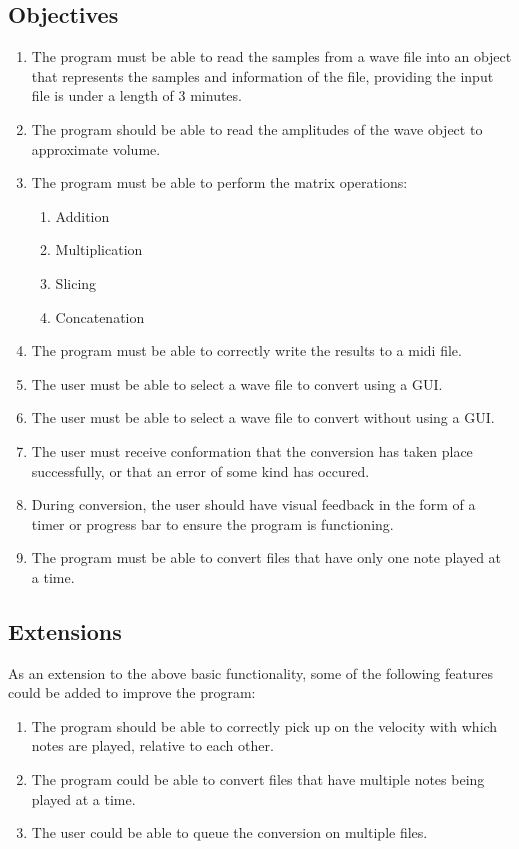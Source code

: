 \documentclass[12pt]{report}
\begin{document}
\subsection*{Objectives}
\begin{enumerate}
    \item The program must be able to read the samples from a wave file into an object that represents the samples and information of the file, providing the input file is under a length of 3 minutes.
    \item The program should be able to read the amplitudes of the wave object to approximate volume.
    \item The program must be able to perform the matrix operations:
    \begin{enumerate}
        \item Addition
        \item Multiplication
        \item Slicing
        \item Concatenation
    \end{enumerate}
    \item The program must be able to correctly write the results to a midi file.
    \item The user must be able to select a wave file to convert using a GUI.
    \item The user must be able to select a wave file to convert without using a GUI.
    \item The user must receive conformation that the conversion has taken place successfully, or that an error of some kind has occured.
    \item During conversion, the user should have visual feedback in the form of a timer or progress bar to ensure the program is functioning.
    \item The program must be able to convert files that have only one note played at a time.
\end{enumerate}

\subsection*{Extensions}

As an extension to the above basic functionality, some of the following features could be added to improve the program:

\begin{enumerate}
    \item The program should be able to correctly pick up on the velocity with which notes are played, relative to each other.
    \item The program could be able to convert files that have multiple notes being played at a time.
    \item The user could be able to queue the conversion on multiple files.
\end{enumerate}
\end{document}
